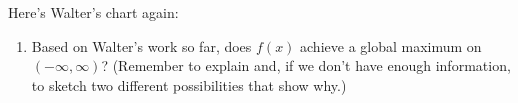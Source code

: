 \documentclass{article}
\begin{document}
\begin{enumerate}
\begin{enumerate}
  \end{enumerate}

  \begin{problemonly}
    Here's Walter's chart again:
    \begin{center}
    \end{center}
  \end{problemonly}

  \begin{enumerate}[resume]
  \item
    \begin{problem}[\vfill]
      Based on Walter's work so far, does $f(x)$ achieve a global maximum on $(-\infty, \infty)$? (Remember to explain and, if we don't have enough information, to sketch two different possibilities that show why.) 
    \end{problem}


\end{enumerate}
\end{enumerate}
\end{document}
